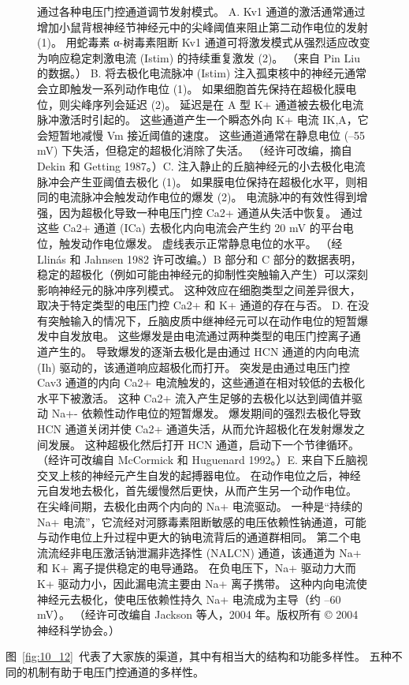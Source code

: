 \begin{figure}[htbp]
	\caption{通过各种电压门控通道调节发射模式。 A. Kv1 通道的激活通常通过增加小鼠背根神经节神经元中的尖峰阈值来阻止第二动作电位的发射 (1)。 用蛇毒素 α-树毒素阻断 Kv1 通道可将激发模式从强烈适应改变为响应稳定刺激电流 (Istim) 的持续重复激发 (2)。 （来自 Pin Liu 的数据。） B. 将去极化电流脉冲 (Istim) 注入孤束核中的神经元通常会立即触发一系列动作电位 (1)。 如果细胞首先保持在超极化膜电位，则尖峰序列会延迟 (2)。 延迟是在 A 型 K+ 通道被去极化电流脉冲激活时引起的。 这些通道产生一个瞬态外向 K+ 电流 IK,A，它会短暂地减慢 Vm 接近阈值的速度。 这些通道通常在静息电位 (–55 mV) 下失活，但稳定的超极化消除了失活。 （经许可改编，摘自 Dekin 和 Getting 1987。）C. 注入静止的丘脑神经元的小去极化电流脉冲会产生亚阈值去极化 (1)。 如果膜电位保持在超极化水平，则相同的电流脉冲会触发动作电位的爆发 (2)。 电流脉冲的有效性得到增强，因为超极化导致一种电压门控 Ca2+ 通道从失活中恢复。 通过这些 Ca2+ 通道 (ICa) 去极化内向电流会产生约 20 mV 的平台电位，触发动作电位爆发。 虚线表示正常静息电位的水平。 （经 Llinás 和 Jahnsen 1982 许可改编。）B 部分和 C 部分的数据表明，稳定的超极化（例如可能由神经元的抑制性突触输入产生）可以深刻影响神经元的脉冲序列模式。 这种效应在细胞类型之间差异很大，取决于特定类型的电压门控 Ca2+ 和 K+ 通道的存在与否。 D. 在没有突触输入的情况下，丘脑皮质中继神经元可以在动作电位的短暂爆发中自发放电。 这些爆发是由电流通过两种类型的电压门控离子通道产生的。 导致爆发的逐渐去极化是由通过 HCN 通道的内向电流 (Ih) 驱动的，该通道响应超极化而打开。 突发是由通过电压门控 Cav3 通道的内向 Ca2+ 电流触发的，这些通道在相对较低的去极化水平下被激活。 这种 Ca2+ 流入产生足够的去极化以达到阈值并驱动 Na+- 依赖性动作电位的短暂爆发。 爆发期间的强烈去极化导致 HCN 通道关闭并使 Ca2+ 通道失活，从而允许超极化在发射爆发之间发展。 这种超极化然后打开 HCN 通道，启动下一个节律循环。 （经许可改编自 McCormick 和 Huguenard 1992。）E. 来自下丘脑视交叉上核的神经元产生自发的起搏器电位。 在动作电位之后，神经元自发地去极化，首先缓慢然后更快，从而产生另一个动作电位。 在尖峰间期，去极化由两个内向的 Na+ 电流驱动。 一种是“持续的 Na+ 电流”，它流经对河豚毒素阻断敏感的电压依赖性钠通道，可能与动作电位上升过程中更大的钠电流背后的通道群相同。 第二个电流流经非电压激活钠泄漏非选择性 (NALCN) 通道，该通道为 Na+ 和 K+ 离子提供稳定的电导通路。 在负电压下，Na+ 驱动力大而 K+ 驱动力小，因此漏电流主要由 Na+ 离子携带。 这种内向电流使神经元去极化，使电压依赖性持久 Na+ 电流成为主导（约 –60 mV）。 （经许可改编自 Jackson 等人，2004 年。版权所有 © 2004 神经科学协会。）}
	\label{fig:10_15}
\end{figure}


图~\ref{fig:10_12}~代表了大家族的渠道，其中有相当大的结构和功能多样性。
五种不同的机制有助于电压门控通道的多样性。


